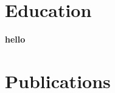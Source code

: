 \documentclass{oneycv}
\begin{document}
\section{Education}
\textbf{hello}
\section{Publications}
\end{document}
